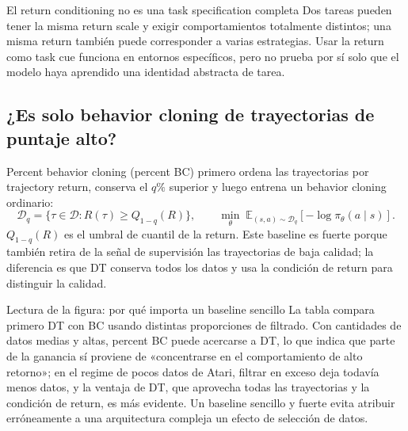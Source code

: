 \begin{warningbox}{El return conditioning no es una task specification completa}
Dos tareas pueden tener la misma return scale y exigir comportamientos totalmente distintos; una misma return también puede corresponder a varias estrategias. Usar la return como task cue funciona en entornos específicos, pero no prueba por sí solo que el modelo haya aprendido una identidad abstracta de tarea.
\end{warningbox}

\subsection{¿Es solo behavior cloning de trayectorias de puntaje alto?}

Percent behavior cloning (percent BC) primero ordena las trayectorias por trajectory return, conserva el $q\%$ superior y luego entrena un behavior cloning ordinario:
\[
\mathcal{D}_{q}=\{\tau\in\mathcal{D}:R(\tau)\ge Q_{1-q}(R)\},
\qquad
\min_{\theta}\;\mathbb{E}_{(s,a)\sim\mathcal{D}_q}[-\log\pi_{\theta}(a\mid s)].
\]
$Q_{1-q}(R)$ es el umbral de cuantil de la return. Este baseline es fuerte porque también retira de la señal de supervisión las trayectorias de baja calidad; la diferencia es que DT conserva todos los datos y usa la condición de return para distinguir la calidad.


\begin{knowledgebox}{Lectura de la figura: por qué importa un baseline sencillo}
La tabla compara primero DT con BC usando distintas proporciones de filtrado. Con cantidades de datos medias y altas, percent BC puede acercarse a DT, lo que indica que parte de la ganancia sí proviene de «concentrarse en el comportamiento de alto retorno»; en el regime de pocos datos de Atari, filtrar en exceso deja todavía menos datos, y la ventaja de DT, que aprovecha todas las trayectorias y la condición de return, es más evidente. Un baseline sencillo y fuerte evita atribuir erróneamente a una arquitectura compleja un efecto de selección de datos.
\end{knowledgebox}



